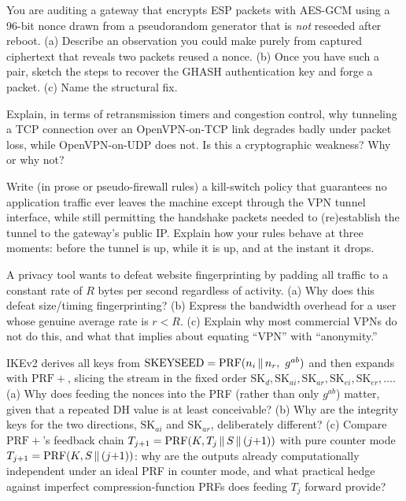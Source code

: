 \begin{exercise}
You are auditing a gateway that encrypts ESP packets with AES-GCM using a 96-bit nonce drawn from a pseudorandom generator that is \emph{not} reseeded after reboot. (a) Describe an observation you could make purely from captured ciphertext that reveals two packets reused a nonce. (b) Once you have such a pair, sketch the steps to recover the GHASH authentication key and forge a packet. (c) Name the structural fix.
\end{exercise}

\begin{exercise}
Explain, in terms of retransmission timers and congestion control, why tunneling a TCP connection over an OpenVPN-on-TCP link degrades badly under packet loss, while OpenVPN-on-UDP does not. Is this a cryptographic weakness? Why or why not?
\end{exercise}

\begin{exercise}
Write (in prose or pseudo-firewall rules) a kill-switch policy that guarantees no application traffic ever leaves the machine except through the VPN tunnel interface, while still permitting the handshake packets needed to (re)establish the tunnel to the gateway's public IP. Explain how your rules behave at three moments: before the tunnel is up, while it is up, and at the instant it drops.
\end{exercise}

\begin{exercise}
A privacy tool wants to defeat website fingerprinting by padding all traffic to a constant rate of \(R\) bytes per second regardless of activity. (a) Why does this defeat size/timing fingerprinting? (b) Express the bandwidth overhead for a user whose genuine average rate is \(r < R\). (c) Explain why most commercial VPNs do not do this, and what that implies about equating ``VPN'' with ``anonymity.''
\end{exercise}

\begin{exercise}
IKEv2 derives all keys from \(\mathrm{SKEYSEED} = \mathrm{PRF}(n_i\concat n_r,\ g^{ab})\) and then expands with \(\mathrm{PRF{+}}\), slicing the stream in the fixed order \(\mathrm{SK}_d, \mathrm{SK}_{ai}, \mathrm{SK}_{ar}, \mathrm{SK}_{ei}, \mathrm{SK}_{er}, \dots\). (a) Why does feeding the nonces into the PRF (rather than only \(g^{ab}\)) matter, given that a repeated DH value is at least conceivable? (b) Why are the integrity keys for the two directions, \(\mathrm{SK}_{ai}\) and \(\mathrm{SK}_{ar}\), deliberately different? (c) Compare \(\mathrm{PRF{+}}\)'s feedback chain \(T_{j+1} = \mathrm{PRF}(K, T_j \,\|\, S \,\|\, (j{+}1))\) with pure counter mode \(T_{j+1} = \mathrm{PRF}(K, S \,\|\, (j{+}1))\): why are the outputs already computationally independent under an ideal PRF in counter mode, and what practical hedge against imperfect compression-function PRFs does feeding \(T_j\) forward provide?
\end{exercise}

